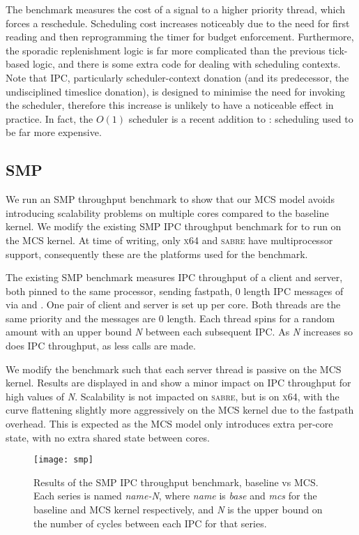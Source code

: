 The  benchmark measures the cost of a signal to a higher priority thread, which forces a reschedule.
Scheduling cost increases noticeably due to the need for first reading
and then reprogramming the timer for budget enforcement. Furthermore,
the sporadic replenishment logic is far more complicated than the
previous tick-based logic, and there is some extra code for
dealing with scheduling contexts. Note that \selfour IPC,
particularly scheduler-context donation (and its predecessor, the
undisciplined timeslice donation), is designed to minimise the need for
invoking the scheduler, therefore this increase is unlikely to have
a noticeable effect in practice. In fact, the \(O(1)\) scheduler is a
recent addition to \selfour: scheduling used to be far more expensive.



\subsection{SMP}

We run an SMP throughput benchmark to show that our MCS model
avoids introducing scalability problems on multiple cores compared to the baseline kernel.
We modify the
existing SMP IPC throughput benchmark for \selfour to run on the MCS kernel. 
At time of writing, only \textsc{x64} and \textsc{sabre} have \selfour multiprocessor support, 
consequently these are the platforms used for the benchmark.

The existing SMP benchmark measures IPC throughput of a client and server, both 
pinned to the same processor, sending fastpath, 0 length IPC messages of via \call
and \replyrecv. One pair of client and server is set up per core. Both threads are
the same priority and the messages are 0 length. Each thread spins for a random amount
with an upper bound \textit{N} between each subsequent IPC. As \textit{N} increases so does
IPC throughput, as less calls are made.

We modify the benchmark such that each server thread is passive on the MCS kernel.
Results are displayed in  and show a minor impact on IPC throughput
for high values of \textit{N}. Scalability is not impacted on \textsc{sabre}, but is on \textsc{x64},
with the curve flattening slightly more aggressively on the MCS kernel
due to the fastpath overhead. This is expected as the MCS model only introduces extra 
per-core state, with no extra shared state between cores.

\begin{figure}[ht] 
    \centering
    \texttt{[image: smp]}
    \caption{Results of the SMP IPC throughput benchmark, baseline \selfour vs MCS. 
        Each series is named \textit{name-N}, where \textit{name} is \textit{base} and \textit{mcs} for 
        the baseline and MCS kernel respectively, and \textit{N} is the upper
        bound on the number of cycles between each IPC for that series.}
    \label{f:evaluation-smp}
\end{figure}

